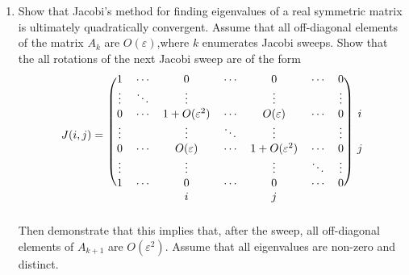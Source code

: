 \documentclass[a4paper,12pt]{article}
\newcommand{\eps}{\varepsilon}
\begin{document}
\begin{enumerate}[label = (\arabic*)]
	\item Show that Jacobi's method for finding eigenvalues of a real symmetric matrix is ultimately quadratically convergent. Assume that all off-diagonal elements of the matrix $ A_k $ are $ O(\eps) $,where $ k $ enumerates Jacobi sweeps. Show that the all rotations of the next Jacobi sweep are of the form
	\[
		\begin{blockarray}{rcccccccc}
			\begin{block}{r(ccccccc)c}
				& 1 & \cdots & 0 & \cdots & 0 & \cdots & 0 & \\
				& \vdots & \ddots & \vdots & & \vdots & & \vdots & \\
				& 0 & \cdots & 1 + O(\eps^2) & \cdots & O(\eps) & \cdots & 0 & i \\
				J(i,j) = & \vdots &  & \vdots & \ddots & \vdots & & \vdots & \\
				& 0 & \cdots & O(\eps) & \cdots & 1 + O(\eps^2) & \cdots & 0 & j \\
				& \vdots &  & \vdots & & \vdots & \ddots & \vdots & \\
				& 1 & \cdots & 0 & \cdots & 0 & \cdots & 0 & \\
			\end{block}
			& & & i & & j & & &
		\end{blockarray}
	\]
	Then demonstrate that this implies that, after the sweep, all off-diagonal elements of $ A_{k+1} $ are $ O(\eps^2) $. Assume that all eigenvalues are non-zero and distinct.
	

\end{enumerate}
\end{document}
